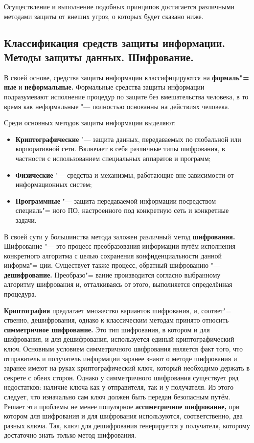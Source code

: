 Осуществление и выполнение подобных принципов достигается различными методами защиты от внеших угроз, о которых будет сказано ниже.


\newpage
\subsection{Классификация средств защиты информации. Методы защиты данных. Шифрование.}
В своей основе, средства защиты информации классифицируются на \textbf{формаль"=
ные} и \textbf{неформальные.} Формальные средства защиты информации подразумевают исполнение процедур по защите 
без вмешательства человека, в то время как неформальные "--- полностью основанны на действиях человека.

Среди основных методов защиты информации выделяют:
\begin{itemize}
    \item \textbf{Криптографические} "--- защита данных, передаваемых по глобальной или корпоративной сети. Включает в себя различные типы шифрования, в частности с использованием специальных аппаратов
    и программ;
    \item \textbf{Физические} "--- средства и механизмы, работающие вне зависимости от информационных систем;
    \item \textbf{Программные} "--- защита передаваемой информации посредством специаль"=
    ного ПО, настроенного под конкретную сеть и конкретные задачи.
\end{itemize}

В своей сути у большинства метода заложен различный метод \textbf{шифрования.} Шифрование "--- это процесс преобразования информации путём исполнения конкретного алгоритма с целью сохранения конфиденциальности
данной информа"=
ции. Существует также процесс, обратный шифрованию "--- \textbf{дешифрование.} Преобразо"=
вание производится согласно выбранному алгоритму шифрования 
и, отталкиваясь от этого, выполняется определённая процедура.

\textbf{Криптография} предлагает множество вариантов шифрования, и, соответ"=
ственно, дешифрования, однако к классическим методам принято относить \textbf{симметричное шифрование.} Это тип шифрования, в котором и для шифрования, и для дешифрования,
используется единый криптографический ключ. Основным условием симметричного шифрования является факт того, что отправитель и получатель информации заранее знают о 
методе шифрования и заранее имеют на руках криптографический ключ, который необходимо держать в секрете с обеих сторон. Однако у симметричного шифрования существует ряд недостатков: наличие ключа как у отправителя, так и у получателя.
Из этого следует, что изначально сам ключ должен быть передан безопасным путём. Решает эти проблемы не менее популярное \textbf{ассиметричное шифрование,} при котором для шифрования и для шифрования используются, соответственно, два разных ключа.
Так, ключ для дешифрования генерируется у получателя, которому достаточно знать только метод шифрования.\cite{shifr}





